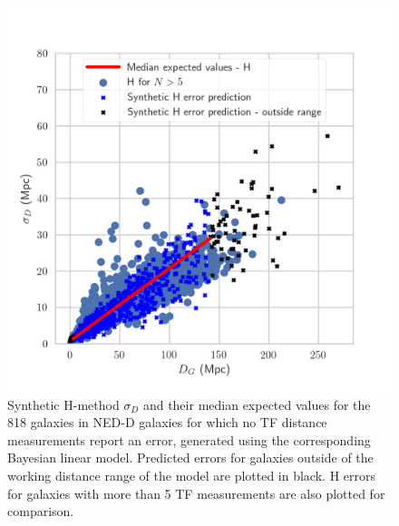 \documentclass[a4paper,fleqn,usenatbib]{mnras}
\begin{document}
\begin{figure}
	\includegraphics[scale=0.7]{predl1.png}
    \caption{Synthetic H-method $\sigma_D$ and their median expected values for the 818 galaxies in NED-D galaxies for which no TF distance measurements report an error, generated using the corresponding Bayesian linear model. Predicted errors for galaxies outside of the working distance range of the model are plotted in black. H errors for galaxies with more than 5 TF measurements are also plotted for comparison.}
    \label{fig:predl1}
\end{figure}
\end{document}

